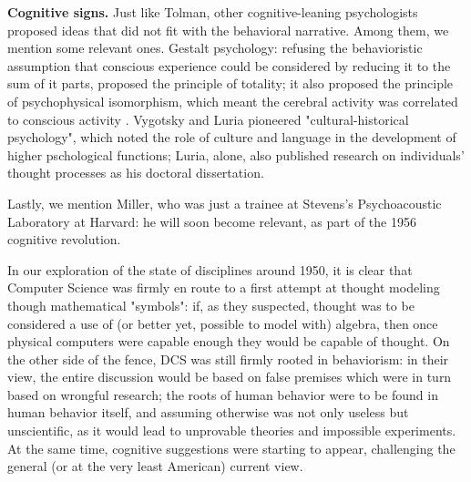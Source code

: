 \documentclass[../main.tex]{subfiles}
\begin{document}
\vspace{4pt}
\textbf{Cognitive signs.} Just like Tolman, other cognitive-leaning psychologists proposed ideas that did not fit with the behavioral narrative. Among them, we mention some relevant ones. Gestalt psychology: refusing the behavioristic assumption that conscious experience could be considered by reducing it to the sum of it parts, proposed the principle of totality; it also proposed the principle of psychophysical isomorphism, which meant the cerebral activity was correlated to conscious activity \cite{wagemansCenturyGestaltPsychology2012}. Vygotsky and Luria pioneered "cultural-historical psychology", which noted the role of culture and language in the development of higher pschological functions; Luria, alone, also published research on individuals' thought processes as his doctoral dissertation.

Lastly, we mention Miller, who was just a trainee at Stevens's Psychoacoustic Laboratory at Harvard: he will soon become relevant, as part of the 1956 cognitive revolution.

\vspace{4pt}
In our exploration of the state of disciplines around 1950, it is clear that Computer Science was firmly en route to a first attempt at thought modeling though mathematical "symbols": if, as they suspected, thought was to be considered a use of (or better yet, possible to model with) algebra, then once physical computers were capable enough they would be capable of thought. On the other side of the fence, DCS was still firmly rooted in behaviorism: in their view, the entire discussion would be based on false premises which were in turn based on wrongful research; the roots of human behavior were to be found in human behavior itself, and assuming otherwise was not only useless but unscientific, as it would lead to unprovable theories and impossible experiments. At the same time, cognitive suggestions were starting to appear, challenging the general (or at the very least American) current view.
\end{document}
